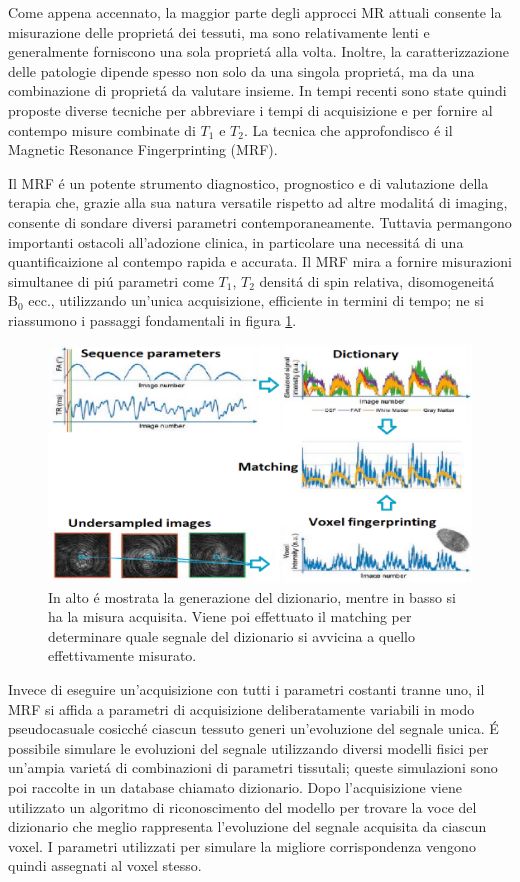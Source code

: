 \documentclass[a4paper,12pt]{report}
\begin{document}
 Come appena accennato, la maggior parte degli approcci MR attuali consente la misurazione delle propriet\'a dei tessuti, ma sono relativamente lenti e generalmente forniscono una sola propriet\'a alla volta. 
 Inoltre, la caratterizzazione delle patologie dipende spesso non solo da una singola propriet\'a, ma da una combinazione di propriet\'a da valutare insieme. 
 In tempi recenti sono state quindi proposte diverse tecniche per abbreviare i tempi di acquisizione e per fornire al contempo misure combinate di $T_1$ e $T_2$. 
 La tecnica che approfondisco \'e il Magnetic Resonance Fingerprinting (MRF). 
 
 Il MRF \'e un potente strumento diagnostico, prognostico e di valutazione della terapia che, grazie alla sua natura versatile rispetto ad altre modalit\'a di imaging, consente di sondare diversi parametri contemporaneamente. 
 Tuttavia permangono importanti ostacoli all'adozione clinica, in particolare una necessit\'a di una quantificaizione al contempo rapida e accurata. 
 Il MRF mira a fornire misurazioni simultanee di pi\'u parametri come $T_1$, $T_2$ densit\'a di spin relativa, disomogeneit\'a $\mbox{B}_0$ ecc., utilizzando un'unica acquisizione, efficiente in termini di tempo; ne si riassumono i passaggi fondamentali in figura \ref{MRFpng}.
 
 \begin{figure}[h!]
  \centering
  \includegraphics[scale=0.5]{MRF.png}
  \caption{In alto \'e mostrata la generazione del dizionario, mentre in basso si ha la misura acquisita. Viene poi effettuato il matching per determinare quale segnale del dizionario si avvicina a quello effettivamente misurato.}
  \label{MRFpng}
 \end{figure}
 
 
 Invece di eseguire un'acquisizione con tutti i parametri costanti tranne uno, il MRF si affida a parametri di acquisizione deliberatamente variabili in modo pseudocasuale cosicch\'e ciascun tessuto generi un'evoluzione del segnale unica. 
 \'E possibile simulare le evoluzioni del segnale utilizzando diversi modelli fisici per un'ampia variet\'a di combinazioni di parametri tissutali; queste simulazioni sono poi raccolte in un database chiamato dizionario. 
 Dopo l'acquisizione viene utilizzato un algoritmo di riconoscimento del modello per trovare la voce del dizionario che meglio rappresenta l'evoluzione del segnale acquisita da ciascun voxel. 
 I parametri utilizzati per simulare la migliore corrispondenza vengono quindi assegnati al voxel stesso. 
 
\end{document}
